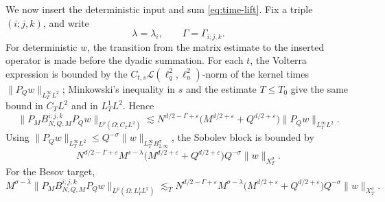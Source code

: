 \documentclass[11pt,reqno]{amsart}
\numberwithin{equation}{section}
\theoremstyle{plain}
\theoremstyle{definition}
\newcommand{\cL}{\mathcal L}
\newcommand{\eps}{\varepsilon}
\begin{document}
We now insert the deterministic input and sum \eqref{eq:time-lift}.  Fix a triple \((i;j,k)\), and write
\[
        \lambda=\lambda_i,
        \qquad
        \Gamma=\Gamma_{i;j,k}.
\]
For deterministic \(w\), the transition from the matrix estimate to the inserted operator is made before the dyadic summation.  For each \(t\), the Volterra expression is bounded by the \(C_{t,s}\cL(\ell_q^2,\ell_n^2)\)-norm of the kernel times \(\|P_Qw\|_{L_T^\infty L^2}\); Minkowski's inequality in \(s\) and the estimate \(T\le T_0\) give the same bound in \(C_TL^2\) and in \(L_T^1L^2\).  Hence
\begin{equation}\label{eq:insert-L2}
        \|P_MB_{N,Q,M}^{i;j,k}P_Qw\|_{L^p(\Omega;C_TL^2)}
        \lesssim
        N^{d/2-\Gamma+\eps}\bigl(M^{d/2+\eps}+Q^{d/2+\eps}\bigr)
        \|P_Qw\|_{L_T^\infty L^2}.
\end{equation}
Using \(\|P_Qw\|_{L_T^\infty L^2}\le Q^{-\sigma}\|w\|_{L_T^\infty B^\sigma_{2,\infty}}\), the Sobolev block is bounded by
\begin{equation}\label{eq:H-block}
        N^{d/2-\Gamma+\eps}M^{s-\lambda}
        \bigl(M^{d/2+\eps}+Q^{d/2+\eps}\bigr)Q^{-\sigma}
        \|w\|_{X_T^\sigma}.
\end{equation}
For the Besov target,
\begin{equation}\label{eq:B-block}
        M^{\sigma-\lambda}
        \|P_MB_{N,Q,M}^{i;j,k}P_Qw\|_{L^p(\Omega;L_T^1L^2)}
        \lesssim_T
        N^{d/2-\Gamma+\eps}M^{\sigma-\lambda}
        \bigl(M^{d/2+\eps}+Q^{d/2+\eps}\bigr)Q^{-\sigma}
        \|w\|_{X_T^\sigma}.
\end{equation}
\end{document}
